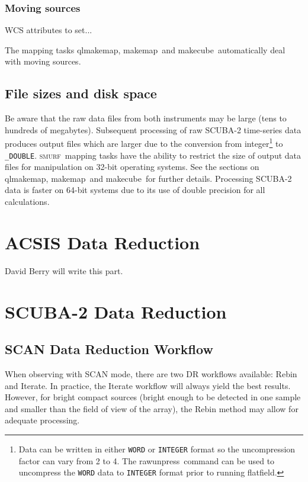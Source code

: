 \documentclass[twoside,11pt]{article}
\newcommand{\xref}[3]{#1}
\newcommand{\xlabel}[1]{}
\renewcommand{\_}{\texttt{\symbol{95}}}
\newcommand{\SMURF}{\textsc{smurf}}
\newcommand{\task}[1]{\textsf{#1}}
\newcommand{\makecube}{\xref{\task{makecube}}{sun258}{MAKECUBE}}
\newcommand{\qlmakemap}{\xref{\task{qlmakemap}}{sun258}{QLMAKEMAP}}
\newcommand{\rawunpress}{\xref{\task{rawunpress}}{sun258}{RAWUNPRESS}}
\newcommand{\flatfield}{\xref{\task{flatfield}}{sun258}{FLATFIELD}}
\newcommand{\makemap}{\xref{\task{makemap}}{sun258}{MAKEMAP}}
\begin{document}
\subsubsection{Moving sources}

WCS attributes to set...

The mapping tasks \qlmakemap, \makemap\ and \makecube\ automatically
deal with moving sources.

\subsection{File sizes and disk space}

Be aware that the raw data files from both instruments may be large
(tens to hundreds of megabytes). Subsequent processing of raw SCUBA-2
time-series data produces output files which are larger
due to the conversion from integer\footnote{Data can be written in either \texttt{\_WORD} or \texttt{\_INTEGER} format so the uncompression factor can vary from 2 to 4. The \rawunpress\ command can be used to uncompress the \texttt{\_WORD} data to \texttt{\_INTEGER} format prior to running \flatfield.}
to \verb+_DOUBLE+. \SMURF\
mapping tasks have the ability to restrict the size of output data
files for manipulation on 32-bit operating systems. See the sections
on \qlmakemap, \makemap\ and \makecube\ for further
details. Processing SCUBA-2 data is faster on 64-bit systems due to
its use of double precision for all calculations.

\section{\xlabel{acsis}ACSIS Data Reduction\label{se:acsisdr}}

David Berry will write this part.

\section{\xlabel{scuba2}SCUBA-2 Data Reduction\label{se:sc2dr}}

\subsection{SCAN Data Reduction Workflow}

When observing with SCAN mode, there are two DR workflows available:
Rebin and Iterate. In practice, the Iterate workflow will always yield
the best results. However, for bright compact sources (bright enough
to be detected in one sample and smaller than the field of view of the
array), the Rebin method may allow for adequate processing.
\end{document}
